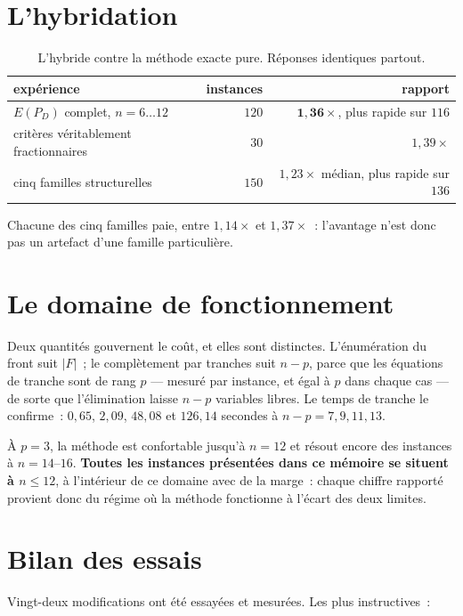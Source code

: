 \documentclass[12pt,a4paper]{report}
\newcommand{\E}{E(P_D)}
\theoremstyle{plain}
\theoremstyle{definition}
\begin{document}
\section{L'hybridation}

\begin{table}[h]
\centering
\caption{L'hybride contre la méthode exacte pure. Réponses identiques partout.}
\begin{tabular}{lrr}
\toprule
expérience & instances & rapport \\
\midrule
$\E$ complet, $n = 6\dots12$ & $120$ & $\mathbf{1{,}36\times}$, plus rapide sur $116$ \\
critères véritablement fractionnaires & $30$ & $1{,}39\times$ \\
cinq familles structurelles & $150$ & $1{,}23\times$ médian, plus rapide sur $136$ \\
\bottomrule
\end{tabular}
\end{table}

\noindent
Chacune des cinq familles paie, entre $1{,}14\times$ et $1{,}37\times$~:
l'avantage n'est donc pas un artefact d'une famille particulière.

\section{Le domaine de fonctionnement}

Deux quantités gouvernent le coût, et elles sont distinctes.  L'énumération du
front suit $|F|$~; le complètement par tranches suit $n - p$, parce que les
équations de tranche sont de rang $p$ --- mesuré par instance, et égal à $p$
dans chaque cas --- de sorte que l'élimination laisse $n-p$ variables libres.
Le temps de tranche le confirme~: $0{,}65$, $2{,}09$, $48{,}08$ et $126{,}14$
secondes à $n-p = 7, 9, 11, 13$.

À $p=3$, la méthode est confortable jusqu'à $n=12$ et résout encore des
instances à $n=14$--$16$.  \textbf{Toutes les instances présentées dans ce
mémoire se situent à $n \leqslant 12$}, à l'intérieur de ce domaine avec de la
marge~: chaque chiffre rapporté provient donc du régime où la méthode
fonctionne à l'écart des deux limites.

\section{Bilan des essais}

Vingt-deux modifications ont été essayées et mesurées.  Les plus instructives~:
\end{document}
